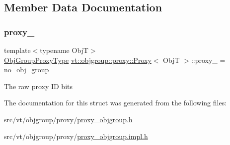 \subsection{Member Data Documentation}
\mbox{\label{structvt_1_1objgroup_1_1proxy_1_1_proxy_a4411a5c2a4719d264060041fd15d9d03}} 
\subsubsection{\texorpdfstring{proxy\+\_\+}{proxy\_}}
{\footnotesize\ttfamily template$<$typename ObjT$>$ \\
\hyperlink{namespacevt_ad7cae989df485fccca57f0792a880a8e}{Obj\+Group\+Proxy\+Type} \hyperlink{structvt_1_1objgroup_1_1proxy_1_1_proxy}{vt\+::objgroup\+::proxy\+::\+Proxy}$<$ ObjT $>$\+::proxy\+\_\+ = no\+\_\+obj\+\_\+group\hspace{0.3cm}{\ttfamily [private]}}

The raw proxy ID bits 

The documentation for this struct was generated from the following files\+:\begin{DoxyCompactItemize}
\item 
src/vt/objgroup/proxy/\hyperlink{proxy__objgroup_8h}{proxy\+\_\+objgroup.\+h}\item 
src/vt/objgroup/proxy/\hyperlink{proxy__objgroup_8impl_8h}{proxy\+\_\+objgroup.\+impl.\+h}\end{DoxyCompactItemize}
